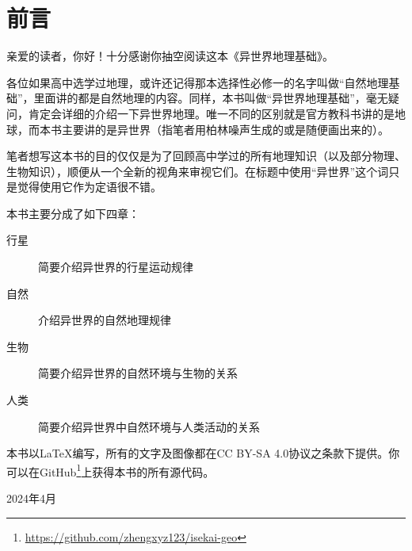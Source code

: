\section*{前言}
亲爱的读者，你好！十分感谢你抽空阅读这本《异世界地理基础》。

各位如果高中选学过地理，或许还记得那本选择性必修一的名字叫做“自然地理基础”，里面讲的都是自然地理的内容。同样，本书叫做“异世界地理基础”，毫无疑问，肯定会详细的介绍一下异世界地理。唯一不同的区别就是官方教科书讲的是地球，而本书主要讲的是异世界（指笔者用柏林噪声生成的或是随便画出来的）。

笔者想写这本书的目的仅仅是为了回顾高中学过的所有地理知识（以及部分物理、生物知识），顺便从一个全新的视角来审视它们。在标题中使用“异世界”这个词只是觉得使用它作为定语很不错。

本书主要分成了如下四章：
\begin{description}
    \item[行星] 简要介绍异世界的行星运动规律
    \item[自然] 介绍异世界的自然地理规律
    \item[生物] 简要介绍异世界的自然环境与生物的关系
    \item[人类] 简要介绍异世界中自然环境与人类活动的关系
\end{description}

本书以\LaTeX 编写，所有的文字及图像都在CC BY-SA 4.0协议之条款下提供。你可以在GitHub\footnote{\url{https://github.com/zhengxyz123/isekai-geo}}上获得本书的所有源代码。

\begin{flushright}
    2024年4月
\end{flushright}

